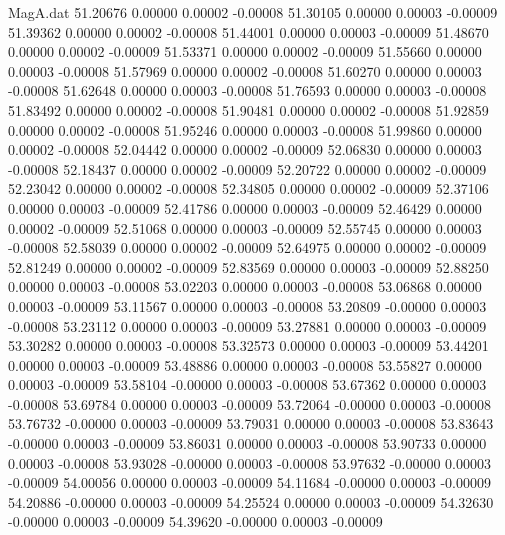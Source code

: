\begin{filecontents}{MagA.dat}
  51.20676    0.00000    0.00002   -0.00008
  51.30105    0.00000    0.00003   -0.00009
  51.39362    0.00000    0.00002   -0.00008
  51.44001    0.00000    0.00003   -0.00009
  51.48670    0.00000    0.00002   -0.00009
  51.53371    0.00000    0.00002   -0.00009
  51.55660    0.00000    0.00003   -0.00008
  51.57969    0.00000    0.00002   -0.00008
  51.60270    0.00000    0.00003   -0.00008
  51.62648    0.00000    0.00003   -0.00008
  51.76593    0.00000    0.00003   -0.00008
  51.83492    0.00000    0.00002   -0.00008
  51.90481    0.00000    0.00002   -0.00008
  51.92859    0.00000    0.00002   -0.00008
  51.95246    0.00000    0.00003   -0.00008
  51.99860    0.00000    0.00002   -0.00008
  52.04442    0.00000    0.00002   -0.00009
  52.06830    0.00000    0.00003   -0.00008
  52.18437    0.00000    0.00002   -0.00009
  52.20722    0.00000    0.00002   -0.00009
  52.23042    0.00000    0.00002   -0.00008
  52.34805    0.00000    0.00002   -0.00009
  52.37106    0.00000    0.00003   -0.00009
  52.41786    0.00000    0.00003   -0.00009
  52.46429    0.00000    0.00002   -0.00009
  52.51068    0.00000    0.00003   -0.00009
  52.55745    0.00000    0.00003   -0.00008
  52.58039    0.00000    0.00002   -0.00009
  52.64975    0.00000    0.00002   -0.00009
  52.81249    0.00000    0.00002   -0.00009
  52.83569    0.00000    0.00003   -0.00009
  52.88250    0.00000    0.00003   -0.00008
  53.02203    0.00000    0.00003   -0.00008
  53.06868    0.00000    0.00003   -0.00009
  53.11567    0.00000    0.00003   -0.00008
  53.20809   -0.00000    0.00003   -0.00008
  53.23112    0.00000    0.00003   -0.00009
  53.27881    0.00000    0.00003   -0.00009
  53.30282    0.00000    0.00003   -0.00008
  53.32573    0.00000    0.00003   -0.00009
  53.44201    0.00000    0.00003   -0.00009
  53.48886    0.00000    0.00003   -0.00008
  53.55827    0.00000    0.00003   -0.00009
  53.58104   -0.00000    0.00003   -0.00008
  53.67362    0.00000    0.00003   -0.00008
  53.69784    0.00000    0.00003   -0.00009
  53.72064   -0.00000    0.00003   -0.00008
  53.76732   -0.00000    0.00003   -0.00009
  53.79031    0.00000    0.00003   -0.00008
  53.83643   -0.00000    0.00003   -0.00009
  53.86031    0.00000    0.00003   -0.00008
  53.90733    0.00000    0.00003   -0.00008
  53.93028   -0.00000    0.00003   -0.00008
  53.97632   -0.00000    0.00003   -0.00009
  54.00056    0.00000    0.00003   -0.00009
  54.11684   -0.00000    0.00003   -0.00009
  54.20886   -0.00000    0.00003   -0.00009
  54.25524    0.00000    0.00003   -0.00009
  54.32630   -0.00000    0.00003   -0.00009
  54.39620   -0.00000    0.00003   -0.00009

\end{filecontents}
